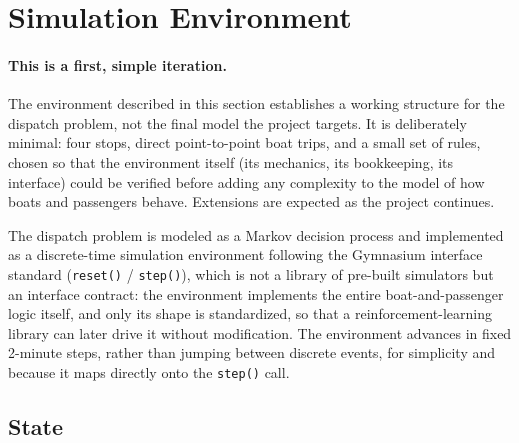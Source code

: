 \documentclass[11pt,a4paper]{article}
\begin{document}
\section{Simulation Environment}
\label{sec:mdp}

\paragraph{This is a first, simple iteration.} The environment described in this section establishes a working structure for the dispatch problem, not the final model the project targets. It is deliberately minimal: four stops, direct point-to-point boat trips, and a small set of rules, chosen so that the environment itself (its mechanics, its bookkeeping, its interface) could be verified before adding any complexity to the model of how boats and passengers behave. Extensions are expected as the project continues.

The dispatch problem is modeled as a Markov decision process and implemented as a discrete-time simulation environment following the Gymnasium interface standard (\texttt{reset()} / \texttt{step()}), which is not a library of pre-built simulators but an interface contract: the environment implements the entire boat-and-passenger logic itself, and only its shape is standardized, so that a reinforcement-learning library can later drive it without modification. The environment advances in fixed 2-minute steps, rather than jumping between discrete events, for simplicity and because it maps directly onto the \texttt{step()} call.

\subsection{State}
\label{sec:state}
\end{document}
